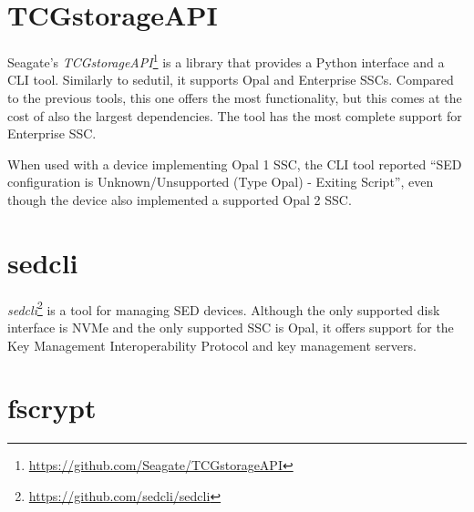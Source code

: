 
\section{TCGstorageAPI}

Seagate's \emph{TCGstorageAPI}\footnote{\url{https://github.com/Seagate/TCGstorageAPI}} is a library that provides a Python interface and a CLI tool. Similarly to sedutil, it supports Opal and Enterprise SSCs.
Compared to the previous tools, this one offers the most functionality, but this comes at the cost of also the largest dependencies. The tool has the most complete support for Enterprise SSC. %

When used with a device implementing Opal 1 SSC, the CLI tool reported ``SED configuration is Unknown/Unsupported (Type Opal) - Exiting Script'', even though the device also implemented a supported Opal 2 SSC.





\section{sedcli}


\emph{sedcli}\footnote{\url{https://github.com/sedcli/sedcli}} is a tool for managing SED devices. Although the only supported disk interface is NVMe and the only supported SSC is Opal, it offers support for the Key Management Interoperability Protocol and key management servers.

\section{fscrypt}

